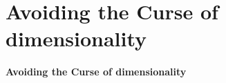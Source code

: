 \documentclass[aspectratio=169,9pt,handout]{beamer}
\begin{document}
\begin{frame}[label=aphylo-current]
\begin{minipage}[m]{.69\linewidth}
	\end{minipage}
	
\end{frame}

\section{Avoiding the Curse of dimensionality}

\begin{frame}[t]
	\textcolor{uscgold}{
		\Large {\bf Avoiding the Curse of dimensionality}
	}
\end{frame}
\end{document}
